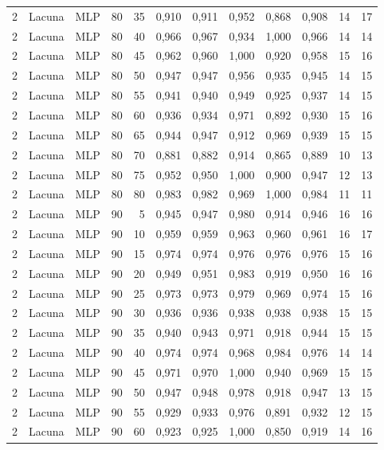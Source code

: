 \begin{longtable}{@{}rllrrrrrrrrr@{}}
2 & Lacuna & MLP & 80 & 35 & 0,910 & 0,911 & 0,952 & 0,868 & 0,908 & 14 & 17 \\
2 & Lacuna & MLP & 80 & 40 & 0,966 & 0,967 & 0,934 & 1,000 & 0,966 & 14 & 14 \\
2 & Lacuna & MLP & 80 & 45 & 0,962 & 0,960 & 1,000 & 0,920 & 0,958 & 15 & 16 \\
2 & Lacuna & MLP & 80 & 50 & 0,947 & 0,947 & 0,956 & 0,935 & 0,945 & 14 & 15 \\
2 & Lacuna & MLP & 80 & 55 & 0,941 & 0,940 & 0,949 & 0,925 & 0,937 & 14 & 15 \\
2 & Lacuna & MLP & 80 & 60 & 0,936 & 0,934 & 0,971 & 0,892 & 0,930 & 15 & 16 \\
2 & Lacuna & MLP & 80 & 65 & 0,944 & 0,947 & 0,912 & 0,969 & 0,939 & 15 & 15 \\
2 & Lacuna & MLP & 80 & 70 & 0,881 & 0,882 & 0,914 & 0,865 & 0,889 & 10 & 13 \\
2 & Lacuna & MLP & 80 & 75 & 0,952 & 0,950 & 1,000 & 0,900 & 0,947 & 12 & 13 \\
2 & Lacuna & MLP & 80 & 80 & 0,983 & 0,982 & 0,969 & 1,000 & 0,984 & 11 & 11 \\
2 & Lacuna & MLP & 90 & 5 & 0,945 & 0,947 & 0,980 & 0,914 & 0,946 & 16 & 16 \\
2 & Lacuna & MLP & 90 & 10 & 0,959 & 0,959 & 0,963 & 0,960 & 0,961 & 16 & 17 \\
2 & Lacuna & MLP & 90 & 15 & 0,974 & 0,974 & 0,976 & 0,976 & 0,976 & 15 & 16 \\
2 & Lacuna & MLP & 90 & 20 & 0,949 & 0,951 & 0,983 & 0,919 & 0,950 & 16 & 16 \\
2 & Lacuna & MLP & 90 & 25 & 0,973 & 0,973 & 0,979 & 0,969 & 0,974 & 15 & 16 \\
2 & Lacuna & MLP & 90 & 30 & 0,936 & 0,936 & 0,938 & 0,938 & 0,938 & 15 & 15 \\
2 & Lacuna & MLP & 90 & 35 & 0,940 & 0,943 & 0,971 & 0,918 & 0,944 & 15 & 15 \\
2 & Lacuna & MLP & 90 & 40 & 0,974 & 0,974 & 0,968 & 0,984 & 0,976 & 14 & 14 \\
2 & Lacuna & MLP & 90 & 45 & 0,971 & 0,970 & 1,000 & 0,940 & 0,969 & 15 & 15 \\
2 & Lacuna & MLP & 90 & 50 & 0,947 & 0,948 & 0,978 & 0,918 & 0,947 & 13 & 15 \\
2 & Lacuna & MLP & 90 & 55 & 0,929 & 0,933 & 0,976 & 0,891 & 0,932 & 12 & 15 \\
2 & Lacuna & MLP & 90 & 60 & 0,923 & 0,925 & 1,000 & 0,850 & 0,919 & 14 & 16 \\

\end{longtable}
